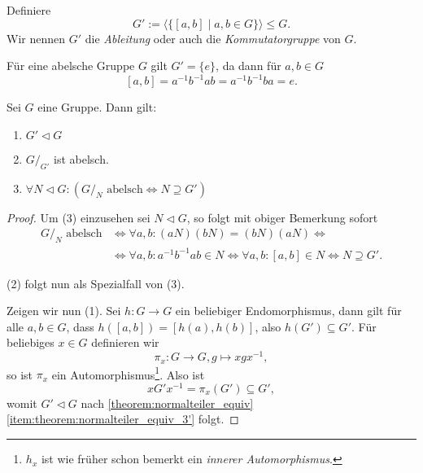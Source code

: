 \begin{definition}
    Definiere
    $$ G' := \langle \{ [a, b] \mid a, b \in G \} \rangle \leq G. $$
    Wir nennen $G'$ die \emph{Ableitung} oder auch die \emph{Kommutatorgruppe} von $G$. 
\end{definition}
    
\begin{remark}
    Für eine abelsche Gruppe $G$ gilt $G' = \{ e \}$, da dann für $a, b \in G$
    $$ [a, b] = a^{-1} b^{-1} a b = a^{-1} b^{-1} b a = e. $$
\end{remark}

\begin{theorem}\label{theorem:kommutatorgruppe}
    Sei $G$ eine Gruppe. Dann gilt:
    \begin{enumerate}
        \item $G' \vartriangleleft G$
        \item $G/_{G'}$ ist abelsch.
        \item $\forall N \vartriangleleft G: ( G/_N \textrm{ abelsch} \Leftrightarrow N \supseteq G')$
    \end{enumerate}
\end{theorem}

\begin{proof}
    Um (3) einzusehen sei $N \vartriangleleft G$, so folgt mit obiger Bemerkung sofort
    \begin{align*}
        G/_N \textrm{ abelsch} &\Leftrightarrow \forall a, b: (aN)(bN) = (bN)(aN) \Leftrightarrow \\ &\Leftrightarrow \forall a, b: a^{-1}b^{-1} a b \in N \Leftrightarrow \forall a, b: [a, b] \in N \Leftrightarrow N \supseteq G'.
    \end{align*}

    (2) folgt nun als Spezialfall von (3).

    Zeigen wir nun (1). Sei $h : G \to G$ ein beliebiger Endomorphismus, dann gilt für alle $a, b \in G$, dass $h([a,b]) = [h(a), h(b)]$, also $h(G') \subseteq G'$. Für beliebiges $x \in G$ definieren wir
    $$ \pi_x : G \to G, g \mapsto xgx^{-1}, $$
    so ist $\pi_x$ ein Automorphismus\footnote{$h_x$ ist wie früher schon bemerkt ein \emph{innerer Automorphismus}.}. Also ist
    $$ x G' x^{-1} = \pi_x(G') \subseteq G', $$
    womit $G' \vartriangleleft G$ nach \cref{theorem:normalteiler_equiv} \cref{item:theorem:normalteiler_equiv_3'} folgt.
\end{proof}

